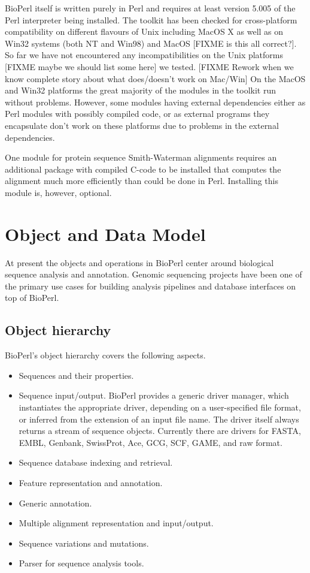 \documentclass{article}
\begin{document}
\begin{twocolumn}
BioPerl itself is written purely in Perl and requires at least version
5.005 of the Perl interpreter being installed.  The toolkit has been
checked for cross-platform compatibility on different flavours of Unix
including MacOS X as well as on Win32 systems (both NT and Win98) and
MacOS [FIXME is this all correct?].  So far we have not encountered any
incompatibilities on the Unix platforms [FIXME maybe we should list
some here] we tested.  [FIXME Rework when we know complete story about
what does/doesn't work on Mac/Win] On the MacOS and Win32 platforms
the great majority of the modules in the toolkit run without
problems.  However, some modules having external dependencies either as
Perl modules with possibly compiled code, or as external programs they
encapsulate don't work on these platforms due to problems in the
external dependencies.

One module for protein sequence Smith-Waterman alignments requires an
additional package with compiled C-code to be installed that computes
the alignment much more efficiently than could be done in
Perl.  Installing this module is, however, optional.

\section{Object and Data Model}

At present the objects and operations in BioPerl center around
biological sequence analysis and annotation.  Genomic sequencing
projects have been one of the primary use cases for building analysis
pipelines and database interfaces on top of BioPerl. 

\subsection{Object hierarchy}

BioPerl's object hierarchy covers the following aspects.
\begin{itemize}
\item Sequences and their properties.
\item Sequence input/output.  BioPerl provides a generic driver
manager, which instantiates the appropriate driver, depending on a
user-specified file format, or inferred from the extension of an input
file name.  The driver itself always returns a stream of sequence
objects.  Currently there are drivers for FASTA, EMBL, Genbank, SwissProt,
Ace, GCG, SCF, GAME, and raw format.
\item Sequence database indexing and retrieval. 
\item Feature representation and annotation.
\item Generic annotation.
\item Multiple alignment representation and input/output.
\item Sequence variations and mutations.
\item Parser for sequence analysis tools.
\end{itemize}


\end{twocolumn}
\end{document}
